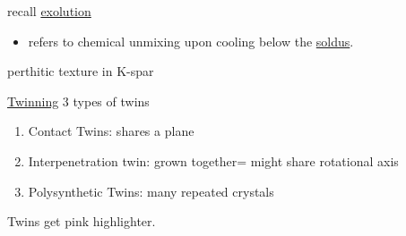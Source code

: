 \documentclass[11pt]{article}
\begin{document}
recall \uline{exolution}
\begin{itemize}
\item refers to chemical unmixing upon cooling below the \uline{soldus}.
\end{itemize}

perthitic texture in K-spar


\uline{Twinning}
3 types of twins
\begin{enumerate}
\item Contact Twins: shares a plane
\item Interpenetration twin: grown together= might share rotational axis
\item Polysynthetic Twins: many repeated crystals
\end{enumerate}

Twins get pink highlighter.
\end{document}
